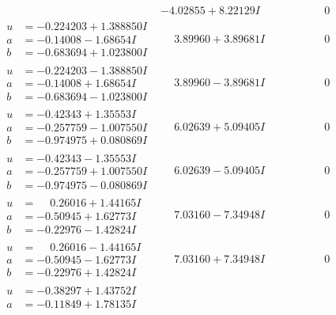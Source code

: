 \documentclass[1p]{elsarticle_modified}
\theoremstyle{definition}
\begin{document}
$$\begin{array}{c|c|c}
 & -4.02855 + 8.22129 I & \phantom{-0.000000 } 0 \\ \hline\begin{aligned}
u &= -0.224203 + 1.388850 I \\
a &= -0.14008 - 1.68654 I \\
b &= -0.683694 + 1.023800 I\end{aligned}
 & \phantom{-}3.89960 + 3.89681 I & \phantom{-0.000000 } 0 \\ \hline\begin{aligned}
u &= -0.224203 - 1.388850 I \\
a &= -0.14008 + 1.68654 I \\
b &= -0.683694 - 1.023800 I\end{aligned}
 & \phantom{-}3.89960 - 3.89681 I & \phantom{-0.000000 } 0 \\ \hline\begin{aligned}
u &= -0.42343 + 1.35553 I \\
a &= -0.257759 - 1.007550 I \\
b &= -0.974975 + 0.080869 I\end{aligned}
 & \phantom{-}6.02639 + 5.09405 I & \phantom{-0.000000 } 0 \\ \hline\begin{aligned}
u &= -0.42343 - 1.35553 I \\
a &= -0.257759 + 1.007550 I \\
b &= -0.974975 - 0.080869 I\end{aligned}
 & \phantom{-}6.02639 - 5.09405 I & \phantom{-0.000000 } 0 \\ \hline\begin{aligned}
u &= \phantom{-}0.26016 + 1.44165 I \\
a &= -0.50945 + 1.62773 I \\
b &= -0.22976 - 1.42824 I\end{aligned}
 & \phantom{-}7.03160 - 7.34948 I & \phantom{-0.000000 } 0 \\ \hline\begin{aligned}
u &= \phantom{-}0.26016 - 1.44165 I \\
a &= -0.50945 - 1.62773 I \\
b &= -0.22976 + 1.42824 I\end{aligned}
 & \phantom{-}7.03160 + 7.34948 I & \phantom{-0.000000 } 0 \\ \hline\begin{aligned}
u &= -0.38297 + 1.43752 I \\
a &= -0.11849 + 1.78135 I \\

\end{aligned}
\end{array}$$
\end{document}
